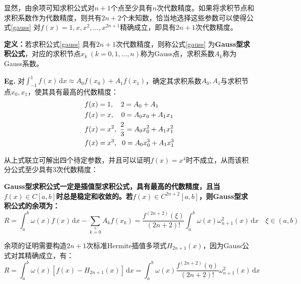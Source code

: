 显然，由余项可知求积公式对$n+1$个点至少具有$n$次代数精度。如果将求积节点和求积系数作为代数精度，则共有$2n+2$个未知数，恰当地选择这些参数可以使得公式\ref{gauss} 对$f(x)=1,x,x^2,\dots,x^{2n+1}$精确成立，即具有$2n+1$次代数精度。

\textbf{定义：}若求积公式\ref{gauss} 具有$2n+1$次代数精度，则称公式\ref{gauss} 为\textbf{Gauss型求积公式}，对应的求积节点$x_k\ (k=0,1,\dots,n)$称为Gauss点，求积系数$A_k$称为Gauss系数。

\textbf{Eg.} 对$\int_{-1}^{1} f(x)\,\mathrm{d}x \approx A_0 f(x_0) + A_1 f(x_1)$，确定其求积系数$A_0, A_1$与求积节点$x_0, x_1$，使其具有最高的代数精度：
{\setlength\abovedisplayskip{0cm} \setlength\belowdisplayskip{0.2cm}
\begin{align}
    f(x) &= 1,\quad 2 = A_0 + A_1 \notag \\
    f(x) &= x,\quad 0 = A_0 x_0 + A_1 x_1 \notag \\ 
    f(x) &= x^2,\  \frac{2}{3} = A_0 x_0^2 + A_1 x_1^2 \notag \\ 
    f(x) &= x^3,\ \  0 = A_0 x_0^3 + A_1 x_1^3 \notag 
\end{align}}

从上式联立可解出四个待定参数，并且可以证明$f(x)=x^4$时不成立，从而该积分公式至少具有3次代数精度：

\textbf{Gauss型求积公式一定是插值型求积公式，具有最高的代数精度，且当$f(x)\in C[a,b]$时总是稳定和收敛的。若$f(x)\in C^{2n+2}[a,b]$，则Gauss型求积公式的余项为：}
\begin{equation}
    R = \int_a^b \omega(x)f(x)\,\mathrm{d}x - \sum\limits_{k=0}\limits^n A_k f(x_k) = \frac{f^{(2n+2)}(\xi)}{(2n+2)!}\int_a^b \omega(x)\omega_{n+1}^2(x)\,\mathrm{d}x\quad \xi \in (a,b)
\end{equation}

余项的证明需要构造$2n+1$次标准Hermite插值多项式$H_{2n+1}(x)$，因为Gauss公式对其精确成立，有：
$$
    R = \int_a^b \omega(x)[f(x) - H_{2n+1}(x)]\,\mathrm{d}x = \int_a^b \omega(x) \frac{f^{(2n+2)}(\eta)}{(2n+2)!}\omega^2_{n+1}(x)\,\mathrm{d}x
$$

